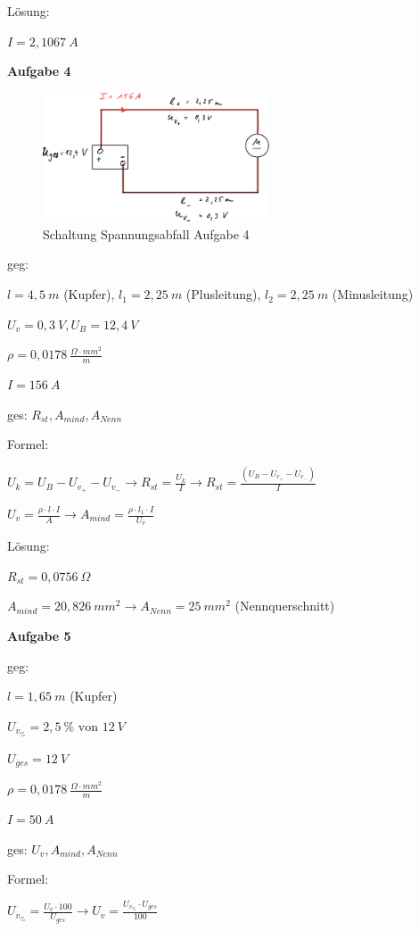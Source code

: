 Lösung:

$I = 2,1067~A$

\textbf{Aufgabe 4}

\begin{figure}[!ht]%
\centering
\includegraphics[width=0.6\textwidth]{images/Skizze/24_FM_Nr4_Reihenschaltung_Aufg4_Skizze.pdf}
\caption{Schaltung Spannungsabfall Aufgabe 4}
\end{figure}

geg:

$l = 4,5~m$ (Kupfer), $l_1 = 2,25~m$ (Plusleitung), $l_2 = 2,25~m$
(Minusleitung)

$U_v = 0,3~V, U_B = 12,4~V$

$\rho = 0,0178~\frac{\Omega \cdot mm^2}{m}$

$I = 156~A$

ges: $R_{st}, A_{mind}, A_{Nenn}$

Formel:

$U_k = U_B - U_{v_+} - U_{v_-} \to R_{st} = \frac{U_k}{I} \to R_{st} = \frac{(U_B - U_{v_+} - U_{v_-})}{I}$

$U_v = \frac{\rho \cdot l \cdot I}{A} \to A_{mind} = \frac{\rho \cdot l_1 \cdot I}{U_v}$

Lösung:

$R_{st} = 0,0756~\Omega$

$A_{mind} = 20,826~mm^2 \to A_{Nenn} = 25~mm^2$ (Nennquerschnitt)

\newpage

\textbf{Aufgabe 5}

geg:

$l = 1,65~m$ (Kupfer)

$U_{v_\%} = 2,5~\% \text{ von } 12~V$

$U_{ges} = 12~V$

$\rho = 0,0178~\frac{\Omega \cdot mm^2}{m}$

$I = 50~A$

ges: $U_v, A_{mind}, A_{Nenn}$

Formel:

$U_{v_\%} = \frac{U_v \cdot 100}{U_{ges}} \to U_v = \frac{U_{v_\%} \cdot U_{ges}}{100}$

